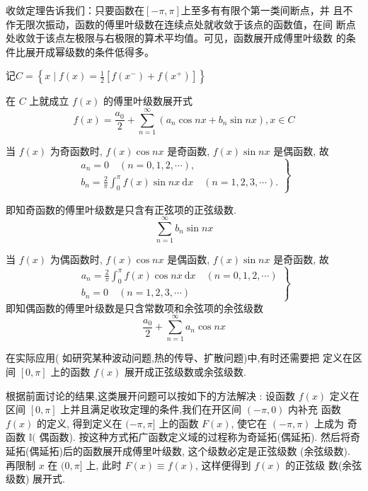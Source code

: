 收敛定理告诉我们：只要函数在$[-\pi,\pi]$上至多有有限个第一类间断点，并
且不作无限次振动，函数的傅里叶级数在连续点处就收敛于该点的函数值，在间
断点处收敛于该点左极限与右极限的算术平均值。可见，函数展开成傅里叶级数
的条件比展开成幂级数的条件低得多。

\begin{corollary}
    记$
C=\left\{x \mid f(x)=\frac{1}{2}\left[f\left(x^{-}\right)+f\left(x^{+}\right)\right]\right\}
$

在 $ C $ 上就成立 $ f(x) $ 的傅里叶级数展开式
$$
f(x)=\frac{a_{0}}{2}+\sum_{n=1}^{\infty}\left(a_{n} \cos n x+b_{n} \sin n x\right), x \in C
$$
\end{corollary}

\begin{definition}[正弦级数]
    当 $ f(x) $ 为奇函数时, $ f(x) \cos n x $ 是奇函数, $ f(x) \sin n x $ 是偶函数, 故
$$
\left.\begin{array}{l}
a_{n}=0 \quad(n=0,1,2, \cdots), \\
b_{n}=\frac{2}{\pi} \int_{0}^{\pi} f(x) \sin n x \mathrm{~d} x \quad(n=1,2,3, \cdots) .
\end{array}\right\}
$$

即知奇函数的傅里叶级数是只含有正弦项的正弦级数.
$$ \sum_{n=1}^{\infty} b_{n} \sin n x $$
\end{definition}

\begin{definition}[余弦级数]
    当 $ f(x) $ 为偶函数时, $ f(x) \cos n x $ 是偶函数, $ f(x) \sin n x $ 是奇函数, 故
$$
\left.\begin{array}{l}
a_{n}=\frac{2}{\pi} \int_{0}^{\pi} f(x) \cos n x \mathrm{~d} x \quad(n=0,1,2, \cdots) \\
b_{n}=0 \quad(n=1,2,3, \cdots)
\end{array}\right\}
$$
即知偶函数的傅里叶级数是只含常数项和余弦项的余弦级数
$$
\frac{a_{0}}{2}+\sum_{n=1}^{\infty} a_{n} \cos n x
$$
\end{definition}

在实际应用( 如研究某种波动问题,热的传导、扩散问题)中,有时还需要把 定义在区间 $ [0, \pi] $ 上的函数 $ f(x) $ 展开成正弦级数或余弦级数.

根据前面讨论的结果,这类展开问题可以按如下的方法解决 : 设函数 $ f(x) $ 定义在区间 $ [0, \pi] $ 上并且满足收玫定理的条件,我们在开区间 $ (-\pi, 0) $ 内补充 函数 $ f(x) $ 的定义, 得到定义在 $ (-\pi, \pi] $ 上的函数 $ F(x) $, 使它在 $ (-\pi, \pi) $ 上成为 奇函数 $ \mathbb{I}( $ 偶函数). 按这种方式拓广函数定义域的过程称为奇延拓(偶延拓). 然后将奇延拓(偶延拓)后的函数展开成傅里叶级数, 这个级数必定是正弦级数 (余弦级数). 再限制 $ x $ 在 $ (0, \pi] $ 上, 此时 $ F(x) \equiv f(x) $, 这样便得到 $ f(x) $ 的正弦级 数(余弦级数) 展开式.


